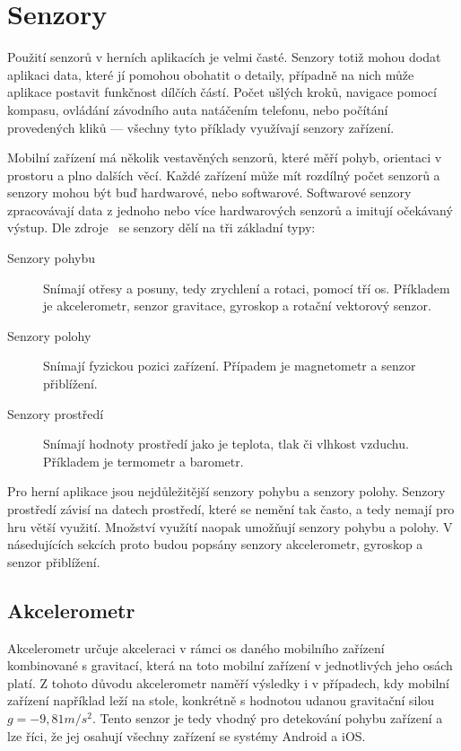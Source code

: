 \section{Senzory}

Použití senzorů v herních aplikacích je velmi časté.
Senzory totiž mohou dodat aplikaci data,
které jí pomohou obohatit o detaily,
případně na nich může aplikace postavit funkčnost dílčích částí.
Počet ušlých kroků,
navigace pomocí kompasu,
ovládání závodního auta natáčením telefonu,
nebo počítání provedených kliků
--- všechny tyto příklady využívají senzory zařízení.
\cite{sensors} 

Mobilní zařízení má několik vestavěných senzorů,
které měří pohyb, orientaci v prostoru a plno dalších věcí.
Každé zařízení může mít rozdílný počet senzorů
a senzory mohou být buď hardwarové, nebo softwarové.
Softwarové senzory zpracovávají data z jednoho nebo více hardwarových senzorů
a imitují očekávaný výstup.
Dle zdroje~\cite{sensors} se senzory dělí na tři základní typy:

\begin{description}
    \item[Senzory pohybu] Snímají otřesy a posuny,
    tedy zrychlení a rotaci,
    pomocí tří os.
    Příkladem je akcelerometr, senzor gravitace, gyroskop
    a rotační vektorový senzor.
    \item[Senzory polohy] Snímají fyzickou pozici zařízení.
    Případem je magnetometr a senzor přiblížení.
    \item[Senzory prostředí] Snímají hodnoty prostředí
    jako je teplota, tlak či vlhkost vzduchu.
    Příkladem je termometr a barometr.
\end{description}

Pro herní aplikace jsou nejdůležitější senzory pohybu a senzory polohy.
Senzory prostředí závisí na datech prostředí,
které se nemění tak často,
a tedy nemají pro hru větší využití.
Množství využítí naopak umožňují senzory pohybu a polohy.
\cite{sensors_android}
V násedujících sekcích proto budou popsány senzory akcelerometr, gyroskop
a senzor přiblížení.

\subsection{Akcelerometr}

Akcelerometr určuje akceleraci v rámci os daného mobilního zařízení
kombinované s gravitací,
která na toto mobilní zařízení v jednotlivých jeho osách platí.
Z tohoto důvodu akcelerometr naměří výsledky i v případech,
kdy mobilní zařízení například leží na stole,
konkrétně s hodnotou udanou gravitační silou $g = -9,81 m/s^2$.
\cite{sensors_motion}
Tento senzor je tedy vhodný pro detekování pohybu zařízení
a lze říci, že jej osahují všechny zařízení se systémy Android a iOS.

